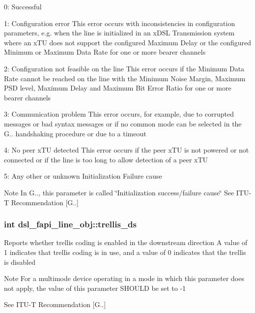 \begin{DoxyItemize}
\item 0\-: Successful
\item 1\-: Configuration error This error occurs with inconsistencies in configuration parameters, e.\-g. when the line is initialized in an x\-D\-S\-L Transmission system where an x\-T\-U does not support the configured Maximum Delay or the configured Minimum or Maximum Data Rate for one or more bearer channels
\item 2\-: Configuration not feasible on the line This error occurs if the Minimum Data Rate cannot be reached on the line with the Minimum Noise Margin, Maximum P\-S\-D level, Maximum Delay and Maximum Bit Error Ratio for one or more bearer channels
\item 3\-: Communication problem This error occurs, for example, due to corrupted messages or bad syntax messages or if no common mode can be selected in the G.. handshaking procedure or due to a timeout
\item 4\-: No peer x\-T\-U detected This error occurs if the peer x\-T\-U is not powered or not connected or if the line is too long to allow detection of a peer x\-T\-U
\item 5\-: Any other or unknown Initialization Failure cause \begin{DoxyNote}{Note}
In G.., this parameter is called \char`\"{}\-Initialization success/failure cause\char`\"{} See I\-T\-U-\/\-T Recommendation \mbox{[}G..\mbox{]} 
\end{DoxyNote}

\end{DoxyItemize}\hypertarget{structdsl__fapi__line__obj_a57a4eae0070c86f939ecdd97d5e79120}{
\subsubsection[{trellis\-\_\-ds}]{\setlength{\rightskip}{0pt plus 5cm}int dsl\-\_\-fapi\-\_\-line\-\_\-obj\-::trellis\-\_\-ds}}\label{structdsl__fapi__line__obj_a57a4eae0070c86f939ecdd97d5e79120}
Reports whether trellis coding is enabled in the downstream direction A value of 1 indicates that trellis coding is in use, and a value of 0 indicates that the trellis is disabled \begin{DoxyNote}{Note}
For a multimode device operating in a mode in which this parameter does not apply, the value of this parameter S\-H\-O\-U\-L\-D be set to -\/1 

See I\-T\-U-\/\-T Recommendation \mbox{[}G..\mbox{]} 
\end{DoxyNote}
